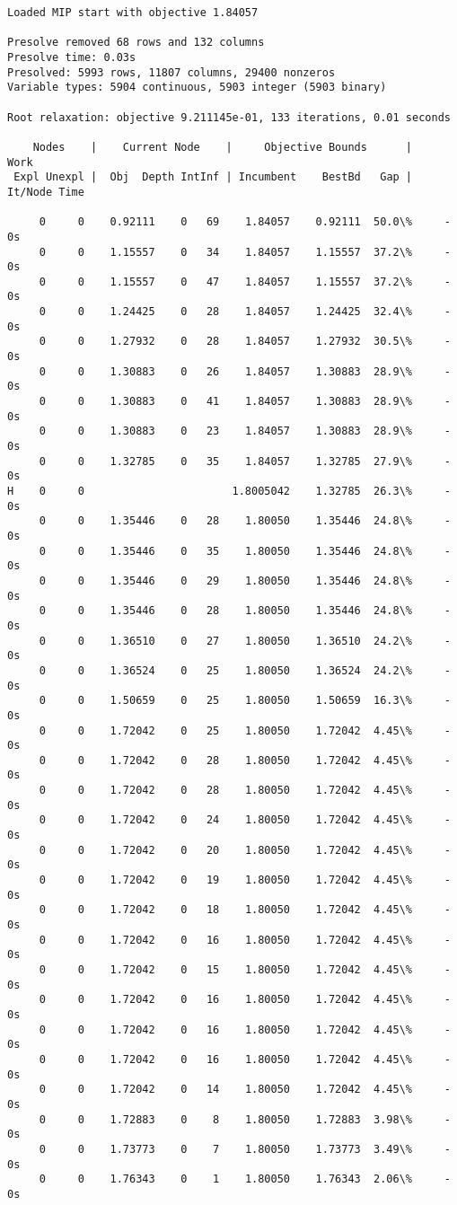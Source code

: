 \documentclass[11pt]{article}
\begin{document}
\begin{Verbatim}[commandchars=\\\{\}]
Loaded MIP start with objective 1.84057

Presolve removed 68 rows and 132 columns
Presolve time: 0.03s
Presolved: 5993 rows, 11807 columns, 29400 nonzeros
Variable types: 5904 continuous, 5903 integer (5903 binary)

Root relaxation: objective 9.211145e-01, 133 iterations, 0.01 seconds

    Nodes    |    Current Node    |     Objective Bounds      |     Work
 Expl Unexpl |  Obj  Depth IntInf | Incumbent    BestBd   Gap | It/Node Time

     0     0    0.92111    0   69    1.84057    0.92111  50.0\%     -    0s
     0     0    1.15557    0   34    1.84057    1.15557  37.2\%     -    0s
     0     0    1.15557    0   47    1.84057    1.15557  37.2\%     -    0s
     0     0    1.24425    0   28    1.84057    1.24425  32.4\%     -    0s
     0     0    1.27932    0   28    1.84057    1.27932  30.5\%     -    0s
     0     0    1.30883    0   26    1.84057    1.30883  28.9\%     -    0s
     0     0    1.30883    0   41    1.84057    1.30883  28.9\%     -    0s
     0     0    1.30883    0   23    1.84057    1.30883  28.9\%     -    0s
     0     0    1.32785    0   35    1.84057    1.32785  27.9\%     -    0s
H    0     0                       1.8005042    1.32785  26.3\%     -    0s
     0     0    1.35446    0   28    1.80050    1.35446  24.8\%     -    0s
     0     0    1.35446    0   35    1.80050    1.35446  24.8\%     -    0s
     0     0    1.35446    0   29    1.80050    1.35446  24.8\%     -    0s
     0     0    1.35446    0   28    1.80050    1.35446  24.8\%     -    0s
     0     0    1.36510    0   27    1.80050    1.36510  24.2\%     -    0s
     0     0    1.36524    0   25    1.80050    1.36524  24.2\%     -    0s
     0     0    1.50659    0   25    1.80050    1.50659  16.3\%     -    0s
     0     0    1.72042    0   25    1.80050    1.72042  4.45\%     -    0s
     0     0    1.72042    0   28    1.80050    1.72042  4.45\%     -    0s
     0     0    1.72042    0   28    1.80050    1.72042  4.45\%     -    0s
     0     0    1.72042    0   24    1.80050    1.72042  4.45\%     -    0s
     0     0    1.72042    0   20    1.80050    1.72042  4.45\%     -    0s
     0     0    1.72042    0   19    1.80050    1.72042  4.45\%     -    0s
     0     0    1.72042    0   18    1.80050    1.72042  4.45\%     -    0s
     0     0    1.72042    0   16    1.80050    1.72042  4.45\%     -    0s
     0     0    1.72042    0   15    1.80050    1.72042  4.45\%     -    0s
     0     0    1.72042    0   16    1.80050    1.72042  4.45\%     -    0s
     0     0    1.72042    0   16    1.80050    1.72042  4.45\%     -    0s
     0     0    1.72042    0   16    1.80050    1.72042  4.45\%     -    0s
     0     0    1.72042    0   14    1.80050    1.72042  4.45\%     -    0s
     0     0    1.72883    0    8    1.80050    1.72883  3.98\%     -    0s
     0     0    1.73773    0    7    1.80050    1.73773  3.49\%     -    0s
     0     0    1.76343    0    1    1.80050    1.76343  2.06\%     -    0s


\end{Verbatim}
\end{document}
